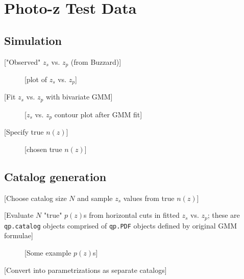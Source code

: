 \documentclass[\docopts]{\docclass}
\begin{document}

\section{Photo-z Test Data}
\label{sec:data}

\subsection{Simulation}
\label{sec:mock}

["Observed" $z_{s}$ vs. $z_{p}$ (from Buzzard)]

\begin{figure}
\caption{[plot of $z_{s}$ vs. $z_{p}$]\label{fig:observed}}
\end{figure}

[Fit $z_{s}$ vs. $z_{p}$ with bivariate GMM]

\begin{figure}
\caption{[$z_{s}$ vs. $z_{p}$ contour plot after GMM fit]\label{fig:fit}}
\end{figure}

[Specify true $n(z)$]

\begin{figure}
\caption{[chosen true $n(z)$]\label{fig:nz}}
\end{figure}

\subsection{Catalog generation}
\label{sec:catalogs}

[Choose catalog size $N$ and sample $z_{s}$ values from true $n(z)$]

[Evaluate $N$ "true" $p(z)$s from horizontal cuts in fitted $z_{s}$ vs. $z_{p}$; these are \texttt{qp.catalog} objects comprised of \texttt{qp.PDF} objects defined by original GMM formulae]

\begin{figure}
\caption{[Some example $p(z)$s]\label{fig:pzs}}
\end{figure}

[Convert into parametrizations as separate catalogs]

\end{document}
